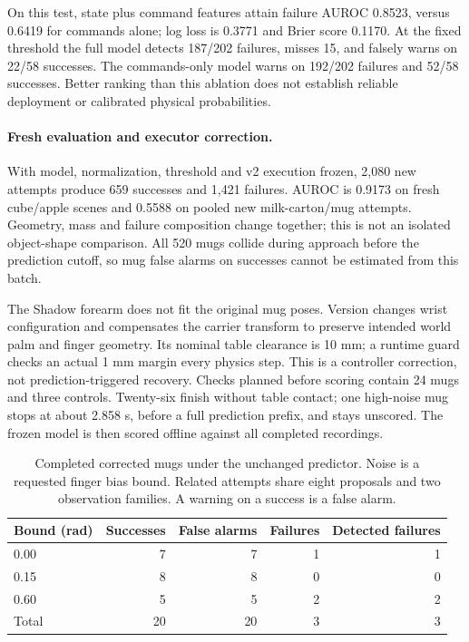 \documentclass[10pt,letterpaper]{article}
\begin{document}
On this test, state plus command features attain failure AUROC 0.8523, versus
0.6419 for commands alone; log loss is 0.3771 and Brier score 0.1170.
At the fixed threshold the full model detects 187/202 failures, misses 15,
and falsely warns on 22/58 successes. The commands-only model warns on
192/202 failures and 52/58 successes. Better ranking than this ablation does
not establish reliable deployment or calibrated physical probabilities.

\paragraph{Fresh evaluation and executor correction.}
With model, normalization, threshold and v2 execution frozen, 2,080 new attempts
produce 659 successes and 1,421 failures. AUROC is 0.9173 on fresh cube/apple
scenes and 0.5588 on pooled new milk-carton/mug attempts. Geometry, mass and
failure composition change together; this is not an isolated object-shape
comparison. All 520 mugs collide during approach before the prediction cutoff,
so mug false alarms on successes cannot be estimated from this batch.

The Shadow forearm does not fit the original mug poses. Version
 changes wrist configuration and
compensates the carrier transform to preserve intended world palm and finger
geometry. Its nominal table clearance is 10 mm; a runtime guard checks an
actual 1 mm margin every physics step. This is a controller correction, not
prediction-triggered recovery. Checks planned before scoring contain 24 mugs
and three controls. Twenty-six finish without table contact; one high-noise
mug stops at about 2.858 s, before a full prediction prefix, and stays unscored.
The frozen model is then scored offline against all completed recordings.

\begin{table}[ht]
\centering
\caption{Completed corrected mugs under the unchanged predictor. Noise is a
requested finger bias bound. Related attempts share eight proposals and two
observation families. A warning on a success is a false alarm.}
\begin{tabular}{lrrrr}
\toprule
Bound (rad) & Successes & False alarms & Failures & Detected failures\\
\midrule
0.00 & 7 & 7 & 1 & 1\\
0.15 & 8 & 8 & 0 & 0\\
0.60 & 5 & 5 & 2 & 2\\
\midrule
Total & 20 & 20 & 3 & 3\\
\bottomrule
\end{tabular}
\end{table}
\end{document}
